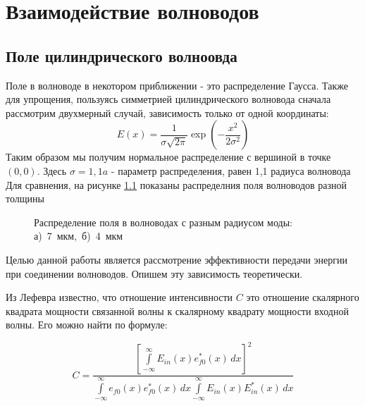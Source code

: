 \chapter{Взаимодействие волноводов}
\section{Поле цилиндрического волноовда}
Поле в волноводе в некотором приближении - это распределение Гаусса. Также для упрощения, пользуясь симметрией цилиндрического волновода сначала рассмотрим двухмерный случай, зависимость только от одной координаты:
\begin{equation}
  \label{gauss}
  E(x)=\frac{1}{\sigma\sqrt{2\pi}}\exp\left(-\frac{x^2}{2\sigma^2}\right)
\end{equation}
Таким образом мы получим нормальное распределение с вершиной в точке $(0,0)$.
Здесь $\sigma = 1,1a$ - параметр распределения, равен 1,1 радиуса волновода
Для сравнения, на рисунке \ref{diameter} показаны распределния поля волноводов разной толщины

\begin{figure}[h!]
	\begin{minipage}[h]{0.49\linewidth}
	\end{minipage}
	\hfill
	\begin{minipage}[h]{0.49\linewidth}
	\end{minipage}
	\caption{Распределение поля в волноводах с разным радиусом моды: \mbox{а) 7~мкм, б) 4~мкм}}
	\label{diameter}
\end{figure}

Целью данной работы является рассмотрение эффективности передачи энергии при соединении волноводов. Опишем эту зависимость теоретически.

Из Лефевра известно, что отношение интенсивности $C$ это отношение скалярного квадрата мощности связанной волны к скалярному квадрату мощности входной волны. Его можно найти по формуле:

\begin{equation}
	\label{coupling_full}
	C = \frac{\left[\int\limits_{-\infty}^{\infty}E_{in}(x)e_{f0}^*(x) \,dx\right]^2}
	{\int\limits_{-\infty}^{\infty}e_{f0}(x)e_{f0}^*(x) \,dx
	 \int\limits_{-\infty}^{\infty}E_{in}(x)E_{in}^*(x) \,dx}
\end{equation}


